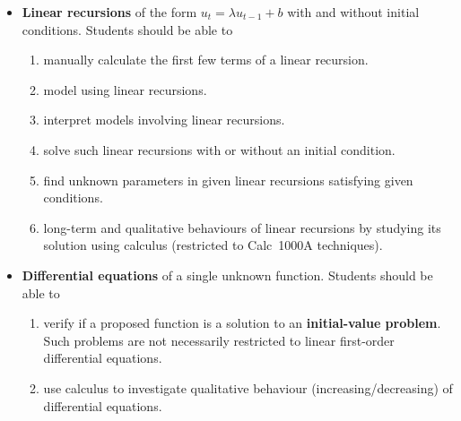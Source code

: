 \documentclass[../main.tex]{subfiles}
\begin{document}
\begin{itemize}
  \item \textbf{Linear recursions} of the form \(u_{t} = \lambda u_{t-1} + b\) with and without initial conditions.  Students should be able to
    \begin{enumerate}
      \item manually calculate the first few terms of a linear recursion.
      \item model using linear recursions.
      \item interpret models involving linear recursions.
      \item solve such linear recursions with or without an initial condition.
      \item find unknown parameters in given linear recursions satisfying given conditions.
      \item long-term and qualitative behaviours of linear recursions by studying its solution using calculus (restricted to Calc~1000A techniques).
    \end{enumerate}

  \item \textbf{Differential equations} of a single unknown function. Students should be able to 
    \begin{enumerate}
      \item verify if a proposed function is a solution to an \textbf{initial-value problem}. Such problems are not necessarily restricted to linear first-order differential equations.
      \item use calculus to investigate qualitative behaviour (increasing/decreasing) of differential equations.
    \end{enumerate}


\end{itemize}
\end{document}

